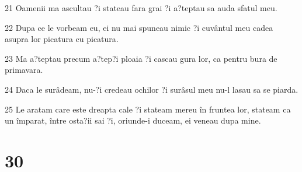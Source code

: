 \par 21 Oamenii ma ascultau ?i stateau fara grai ?i a?teptau sa auda sfatul meu.
\par 22 Dupa ce le vorbeam eu, ei nu mai spuneau nimic ?i cuvântul meu cadea asupra lor picatura cu picatura.
\par 23 Ma a?teptau precum a?tep?i ploaia ?i cascau gura lor, ca pentru bura de primavara.
\par 24 Daca le surâdeam, nu-?i credeau ochilor ?i surâsul meu nu-l lasau sa se piarda.
\par 25 Le aratam care este dreapta cale ?i stateam mereu în fruntea lor, stateam ca un împarat, între osta?ii sai ?i, oriunde-i duceam, ei veneau dupa mine.

\chapter{30}

